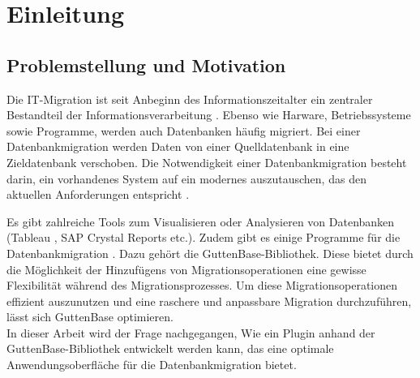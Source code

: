 \chapter{Einleitung}

\section{Problemstellung und Motivation}


Die IT-Migration ist seit Anbeginn des Informationszeitalter ein zentraler Bestandteil der Informationsverarbeitung \cite{wachter2015systemkonsolidierung}. Ebenso wie Harware, Betriebssysteme sowie Programme, werden auch Datenbanken häufig migriert. Bei einer Datenbankmigration werden Daten von einer Quelldatenbank in eine Zieldatenbank verschoben. Die Notwendigkeit einer Datenbankmigration besteht darin, ein vorhandenes System auf ein modernes auszutauschen, das den aktuellen Anforderungen entspricht \cite{housel1974architecture}.

Es gibt zahlreiche Tools zum Visualisieren oder Analysieren von  Datenbanken (Tableau \cite{datig2018telling}, SAP Crystal Reports \cite{duttaroy2016sap} etc.). Zudem gibt es einige Programme für die Datenbankmigration \cite{horstmann2005migration}. Dazu gehört die GuttenBase-Bibliothek. Diese bietet durch die Möglichkeit der Hinzufügens von Migrationsoperationen eine gewisse Flexibilität während des Migrationsprozesses. Um diese Migrationsoperationen effizient auszunutzen und eine raschere und anpassbare Migration durchzuführen, lässt sich GuttenBase optimieren. \\ In dieser Arbeit wird der Frage nachgegangen, Wie ein Plugin anhand der GuttenBase-Bibliothek entwickelt werden kann, das eine optimale Anwendungsoberfläche für die Datenbankmigration bietet.
